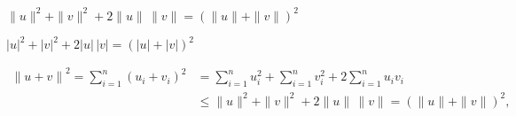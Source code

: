 \(\|u\|^2 + \|v\|^2 + 2 \|u\|\, \|v\| = (\|u\|+\|v\|)^2
\)%

\(|u|^2 + |v|^2 + 2 |u|\, |v| = (|u|+|v|)^2
\)%

\begin{align*}
\left\|u+v\right\|^2 = \sum_{i=1}^n  (u_i + v_i)^2 &= \sum_{i=1}^n  u_i^2 + \sum_{i=1}^n  v_i^2 + 2\sum_{i=1}^n u_i v_i 
\\&\leq 
\|u\|^2 + \|v\|^2 + 2 \|u\|\, \|v\| = (\|u\|+\|v\|)^2,
\end{align*}%
